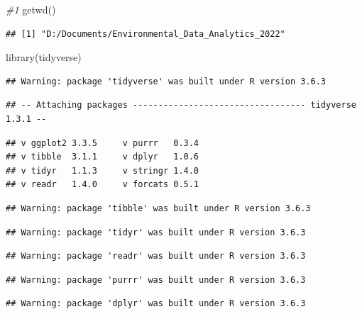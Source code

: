 \documentclass[]{article}
\newenvironment{Shaded}{\begin{snugshade}}{\end{snugshade}}
\newcommand{\CommentTok}[1]{\textcolor[rgb]{0.56,0.35,0.01}{\textit{#1}}}
\newcommand{\FunctionTok}[1]{\textcolor[rgb]{0.00,0.00,0.00}{#1}}
\newcommand{\NormalTok}[1]{#1}
\begin{document}
\begin{Shaded}
\begin{Highlighting}[]
\CommentTok{\#1}
\FunctionTok{getwd}\NormalTok{()}
\end{Highlighting}
\end{Shaded}

\begin{verbatim}
## [1] "D:/Documents/Environmental_Data_Analytics_2022"
\end{verbatim}

\begin{Shaded}
\begin{Highlighting}[]
\FunctionTok{library}\NormalTok{(tidyverse)}
\end{Highlighting}
\end{Shaded}

\begin{verbatim}
## Warning: package 'tidyverse' was built under R version 3.6.3
\end{verbatim}

\begin{verbatim}
## -- Attaching packages ---------------------------------- tidyverse 1.3.1 --
\end{verbatim}

\begin{verbatim}
## v ggplot2 3.3.5     v purrr   0.3.4
## v tibble  3.1.1     v dplyr   1.0.6
## v tidyr   1.1.3     v stringr 1.4.0
## v readr   1.4.0     v forcats 0.5.1
\end{verbatim}

\begin{verbatim}
## Warning: package 'tibble' was built under R version 3.6.3
\end{verbatim}

\begin{verbatim}
## Warning: package 'tidyr' was built under R version 3.6.3
\end{verbatim}

\begin{verbatim}
## Warning: package 'readr' was built under R version 3.6.3
\end{verbatim}

\begin{verbatim}
## Warning: package 'purrr' was built under R version 3.6.3
\end{verbatim}

\begin{verbatim}
## Warning: package 'dplyr' was built under R version 3.6.3
\end{verbatim}
\end{document}
